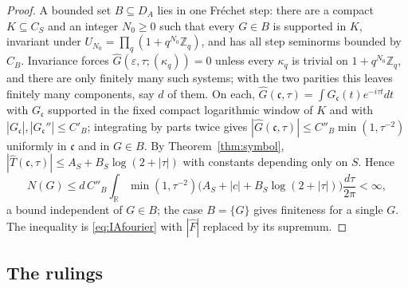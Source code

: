 \documentclass[11pt]{amsart}
\theoremstyle{definition}
\theoremstyle{remark}
\newcommand{\R}{\mathbb R}
\newcommand{\Z}{\mathbb Z}
\newcommand{\Th}{\widehat{T}}
\newcommand{\DA}{D_A}
\begin{document}
\begin{proof}
A bounded set $B\subseteq\DA$ lies in one Fr\'echet step: there are a compact
$K\subseteq C_S$ and an integer $N_0\ge0$ such that every $G\in B$ is supported
in $K$, invariant under $U_{N_0}=\prod_q(1+q^{N_0}\Z_q)$, and has all step
seminorms bounded by $C_B$.  Invariance forces $\widehat G(\varepsilon,\tau;
(\kappa_q))=0$ unless every $\kappa_q$ is trivial on $1+q^{N_0}\Z_q$, and
there are only finitely many such systems; with the two parities this leaves
finitely many components, say $d$ of them.  On each,
$\widehat G(\mathfrak c,\tau)=\int G_{\mathfrak c}(t)e^{-i\tau t}dt$ with
$G_{\mathfrak c}$ supported in the fixed compact logarithmic window of $K$ and
with $|G_{\mathfrak c}|,|G_{\mathfrak c}''|\le C'_B$; integrating by parts twice
gives $|\widehat G(\mathfrak c,\tau)|\le C''_B\min(1,\tau^{-2})$ uniformly in
$\mathfrak c$ and in $G\in B$.  By Theorem~\ref{thm:symbol},
$|\Th(\mathfrak c,\tau)|\le A_S+B_S\log(2+|\tau|)$ with constants depending
only on $S$.  Hence
\[
N(G)\le d\,C''_B\int_{\R}\min(1,\tau^{-2})
\bigl(A_S+|c|+B_S\log(2+|\tau|)\bigr)\frac{d\tau}{2\pi}<\infty ,
\]
a bound independent of $G\in B$; the case $B=\{G\}$ gives finiteness for a
single $G$.  The inequality is \eqref{eq:IAfourier} with $|\widehat F|$ replaced
by its supremum.
\end{proof}

\subsection{The rulings}
\end{document}
